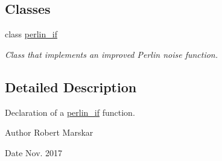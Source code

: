 \subsection*{Classes}
\begin{DoxyCompactItemize}
\item 
class \hyperlink{classperlin__if}{perlin\+\_\+if}
\begin{DoxyCompactList}\small\item\em Class that implements an improved Perlin noise function. \end{DoxyCompactList}\end{DoxyCompactItemize}


\subsection{Detailed Description}
Declaration of a \hyperlink{classperlin__if}{perlin\+\_\+if} function. 

\begin{DoxyAuthor}{Author}
Robert Marskar 
\end{DoxyAuthor}
\begin{DoxyDate}{Date}
Nov. 2017 
\end{DoxyDate}
